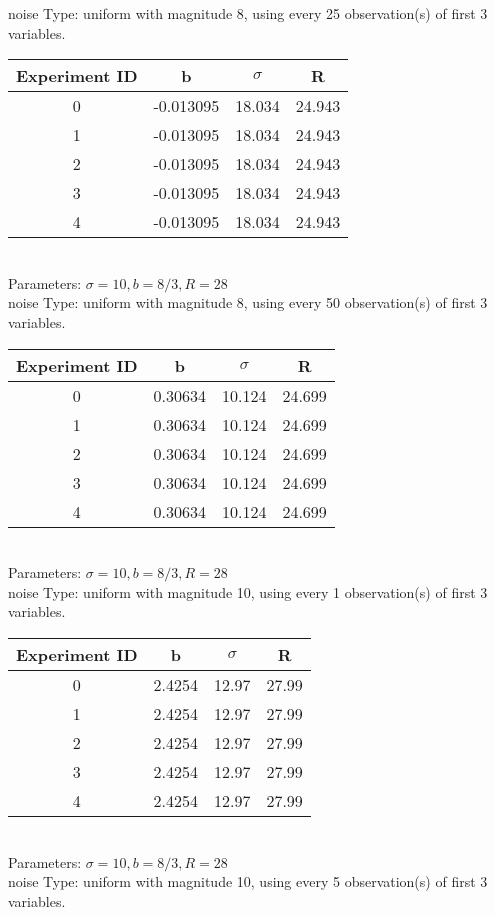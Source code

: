 \begin{multicols}{3}
noise Type: uniform with magnitude 8, using every 25 observation(s) of first 3 variables.\\
\begin{tabular}{cccc}
\hline Experiment ID & b & $\sigma$ & R \\ \hline 
0 & -0.013095 & 18.034 & 24.943\\ \hline 
 1 & -0.013095 & 18.034 & 24.943\\ \hline 
 2 & -0.013095 & 18.034 & 24.943\\ \hline 
 3 & -0.013095 & 18.034 & 24.943\\ \hline 
 4 & -0.013095 & 18.034 & 24.943\\ \hline 
 \end{tabular}\\
Parameters: $\sigma=10, b=8/3, R=28$\\
noise Type: uniform with magnitude 8, using every 50 observation(s) of first 3 variables.\\
\begin{tabular}{cccc}
\hline Experiment ID & b & $\sigma$ & R \\ \hline 
0 & 0.30634 & 10.124 & 24.699\\ \hline 
 1 & 0.30634 & 10.124 & 24.699\\ \hline 
 2 & 0.30634 & 10.124 & 24.699\\ \hline 
 3 & 0.30634 & 10.124 & 24.699\\ \hline 
 4 & 0.30634 & 10.124 & 24.699\\ \hline 
 \end{tabular}\\
Parameters: $\sigma=10, b=8/3, R=28$\\
noise Type: uniform with magnitude 10, using every 1 observation(s) of first 3 variables.\\
\begin{tabular}{cccc}
\hline Experiment ID & b & $\sigma$ & R \\ \hline 
0 & 2.4254 & 12.97 & 27.99\\ \hline 
 1 & 2.4254 & 12.97 & 27.99\\ \hline 
 2 & 2.4254 & 12.97 & 27.99\\ \hline 
 3 & 2.4254 & 12.97 & 27.99\\ \hline 
 4 & 2.4254 & 12.97 & 27.99\\ \hline 
 \end{tabular}\\
Parameters: $\sigma=10, b=8/3, R=28$\\
noise Type: uniform with magnitude 10, using every 5 observation(s) of first 3 variables.\\

\end{multicols}
